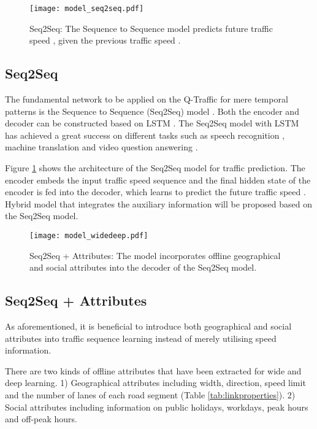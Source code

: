 \begin{figure}[htbp]
\centering
{\texttt{[image: model\_seq2seq.pdf]}}
\caption{Seq2Seq: The Sequence to Sequence model predicts future traffic speed , given the previous traffic speed . } 
\label{fig:model_seq2seq}
\end{figure}

\subsection{Seq2Seq}

The fundamental network to be applied on the Q-Traffic for mere temporal patterns is the Sequence to Sequence (Seq2Seq) model \cite{cho2014learning,sutskever2014sequence}. Both the encoder and decoder can be constructed based on LSTM \cite{hochreiter1997long}. The Seq2Seq model with LSTM has achieved a great success on different tasks such as speech recognition  \cite{graves2014towards}, machine translation  \cite{sutskever2014sequence} and video question answering  \cite{venugopalan2015sequence}. 

Figure \ref{fig:model_seq2seq} shows the architecture of the Seq2Seq model for traffic prediction. The encoder embeds the input traffic speed sequence  and the final hidden state of the encoder is fed into the decoder, which learns to predict the future traffic speed . Hybrid model that integrates the auxiliary information will be proposed based on the Seq2Seq model.

\begin{figure}[htbp]
\centering
\texttt{[image: model\_widedeep.pdf]}
\caption{Seq2Seq + Attributes: The model incorporates offline geographical and social attributes  into the decoder of the Seq2Seq model.}
\label{fig:model_widedeep}
\end{figure}

\subsection{Seq2Seq + Attributes}

As aforementioned, it is beneficial to introduce both geographical and social attributes into traffic sequence learning instead of merely utilising speed information. 

There are two kinds of offline attributes that have been extracted for wide and deep learning. 1) Geographical attributes including width, direction, speed limit and the number of lanes of each road segment (Table \ref{tab:linkproperties}). 2) Social attributes including information on public holidays, workdays, peak hours and off-peak hours.  

